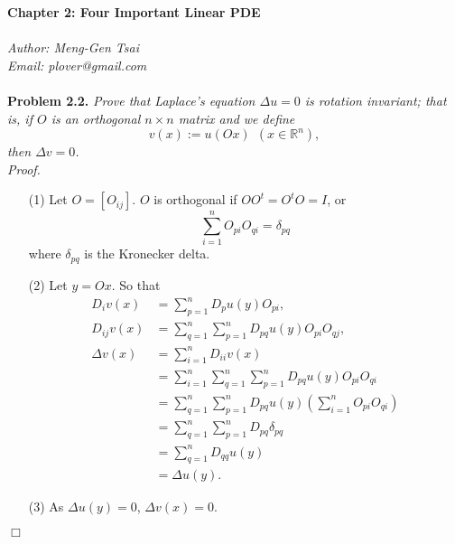 \documentclass{article}
\begin{document}
\textbf{\Large Chapter 2: Four Important Linear PDE} \\\\



\emph{Author: Meng-Gen Tsai} \\
\emph{Email: plover@gmail.com} \\\\









\textbf{Problem 2.2.}
\emph{Prove that Laplace's equation $\Delta u = 0$ is rotation invariant;
that is, if $O$ is an orthogonal $n \times n$ matrix and we define
\[
  v(x) := u(Ox) \:\:(x \in \mathbb{R}^n),
\]
then $\Delta v = 0$.} \\

\emph{Proof.}
\begin{enumerate}
\item[(1)]
Let $O = [O_{ij}]$.
$O$ is orthogonal if $OO^{t} = O^{t}O = I$,
or
\[
  \sum_{i=1}^{n} O_{pi} O_{qi} = \delta_{pq}
\]
where $\delta_{pq}$ is the Kronecker delta.
\item[(2)]
Let $y = Ox$.
So that
\begin{align*}
  D_i v(x)
  &= \sum_{p=1}^{n} D_p u(y) O_{pi}, \\
  D_{ij} v(x)
  &= \sum_{q=1}^{n} \sum_{p=1}^{n} D_{pq}u(y) O_{pi} O_{qj}, \\
  \Delta v(x)
  &= \sum_{i=1}^{n} D_{ii} v(x) \\
  &= \sum_{i=1}^{n} \sum_{q=1}^{n}\sum_{p=1}^{n} D_{pq}u(y) O_{pi} O_{qi} \\
  &= \sum_{q=1}^{n} \sum_{p=1}^{n} D_{pq} u(y) \left( \sum_{i=1}^{n} O_{pi} O_{qi} \right) \\
  &= \sum_{q=1}^{n} \sum_{p=1}^{n} D_{pq} \delta_{pq} \\
  &= \sum_{q=1}^{n} D_{qq}u(y) \\
  &= \Delta u(y).
\end{align*}
\item[(3)]
As $\Delta u(y) = 0$, $\Delta v(x) = 0$.
\end{enumerate}
$\Box$ \\\\



\end{document}
